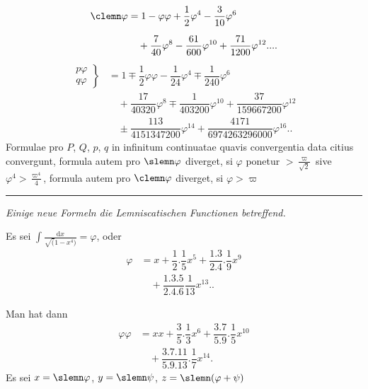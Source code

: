 \[
\begin{aligned}\clemn\varphi&=1-\varphi\varphi+\dfrac12\varphi^4-\dfrac3{10}\varphi^6\\[6pt]&\quad{}+\dfrac7{40}\varphi^8-\dfrac{61}{600}\varphi^{10}+\dfrac{71}{1200}\varphi^{12}\mathord{.}\mathord{.}\mathord{.}\mathord{.}\end{aligned}
\]
\[
\begin{aligned}
\left.\begin{matrix}p\varphi\\q\varphi\end{matrix}\right\}
&=1\mp\dfrac12\varphi\varphi-\dfrac1{24}\varphi^4\mp\dfrac1{240}\varphi^6\\[6pt]&\quad{}+\dfrac{17}{40320}\varphi^8\mp\dfrac1{403200}\varphi^{10}+\dfrac{37}{159667200}\varphi^{12}\\[6pt]
&\quad\pm\dfrac{113}{4151347200}\varphi^{14}+\dfrac{4171}{6974263296000}\varphi^{16}\mathord{.}\mathord{.}
\end{aligned}
\]
Formulae pro $P$, $Q$, $p$, $q$ in infinitum continuatae quavis convergentia data citius convergunt, formula autem pro $\slemn\varphi$ diverget, si $\varphi$ ponetur $>\frac{\varpi}{\surd2}$ sive $\varphi^4>\frac{\varpi^4}{4}$, formula autem pro $\clemn\varphi$ diverget, si $\varphi>\varpi$
\par\begin{center}\rule{.22\linewidth}{.3pt}\end{center}
\par{}\begin{center}\textit{Einige neue Formeln die Lemniscatischen Functionen betreffend.}\end{center}
Es sei $\displaystyle\int\frac{\mathrm{d}x}{\surd(1-x^4)}=\varphi$, oder
\[
\begin{aligned}\varphi&=x+\dfrac12.\dfrac15x^5+\dfrac{1.3}{2.4}.\dfrac19x^9\\[6pt]&\quad{}+\dfrac{1.3.5}{2.4.6}\dfrac1{13}x^{13}\mathord{.}\mathord{.}\end{aligned}
\]

Man hat dann
\[
\begin{aligned}\varphi\varphi&=xx+\dfrac35.\dfrac13x^6+\dfrac{3.7}{5.9}.\dfrac15x^{10}\\[6pt]&\quad{}+\dfrac{3.7.11}{5.9.13}.\dfrac17x^{14}.\end{aligned}
\]
Es sei $x=\slemn\varphi$, $y=\slemn\psi$, $z=\slemn(\varphi+\psi)$

